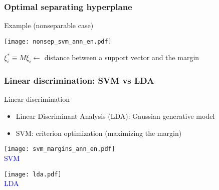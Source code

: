 \begin{frame}
   \frametitle{Optimal separating hyperplane}
    \begin{block}{Example (nonseparable case)}
    \end{block}
 \begin{minipage}{.65\textwidth}
     \begin{center}
      \texttt{[image: nonsep\_svm\_ann\_en.pdf]}
   \end{center}
 \end{minipage} \hfill
\begin{minipage}{.33\textwidth}
                 $\xi_i^* \equiv M \xi_i \leftarrow$ distance between a support vector and the margin
\end{minipage}


\end{frame}



\begin{frame}
  \frametitle{Linear discrimination:  SVM vs LDA}
  \begin{block}{Linear discrimination}
   \begin{itemize}
    \item Linear Discriminant Analysis (LDA): Gaussian generative model
    \item SVM: criterion optimization (maximizing the margin)
   \end{itemize}
  \end{block}


\begin{minipage}{.48\textwidth}
\begin{center}
\texttt{[image: svm\_margins\_ann\_en.pdf]}\\
\textcolor{blue}{SVM}
\end{center}
\end{minipage}
\hfill
\begin{minipage}{.48\textwidth}
\begin{center}
\texttt{[image: lda.pdf]}\\
\textcolor{blue}{LDA}
\end{center}
\end{minipage}

\end{frame}


